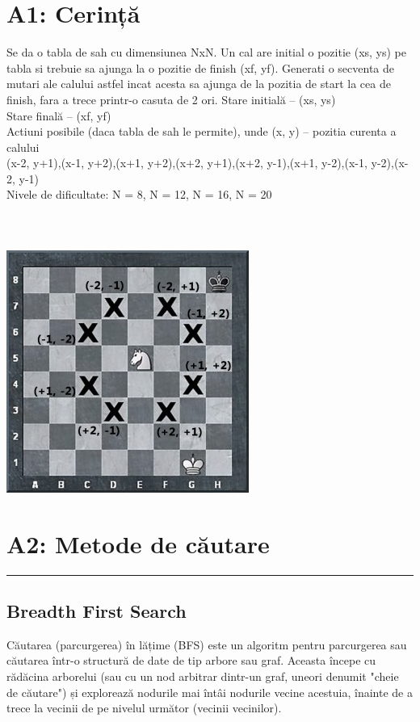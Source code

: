 \documentclass[a4paper,12pt]{report}
\begin{document}
\chapter{A1: Cerință} 
    Se da o tabla de sah cu dimensiunea NxN. Un cal are initial o pozitie (xs, ys) pe tabla si trebuie sa ajunga la o pozitie de finish (xf, yf). Generati o secventa de mutari ale calului astfel incat acesta sa ajunga de la pozitia de start la cea de finish, fara a trece printr-o casuta de 2 ori.
\linebreak 
\linebreak 
\linebreak 
Stare initială – (xs, ys) \\
Stare finală – (xf, yf) \\ 
Actiuni posibile (daca tabla de sah le permite), unde (x, y) – pozitia curenta a calului \\
(x-2, y+1),(x-1, y+2),(x+1, y+2),(x+2, y+1),(x+2, y-1),(x+1, y-2),(x-1, y-2),(x-2, y-1) \\
Nivele de dificultate: N = 8, N = 12, N = 16, N = 20
\\\\\\\\
\includegraphics{problema.png}
\chapter{A2: Metode de căutare} 
 
\rule{\textwidth}{0.5pt}
\section{Breadth First Search}
Căutarea (parcurgerea) în lățime (BFS) este un algoritm pentru parcurgerea sau căutarea într-o structură de date de tip arbore sau graf. Aceasta începe cu rădăcina arborelui (sau cu un nod arbitrar dintr-un graf, uneori denumit "cheie de căutare") și explorează nodurile mai întâi nodurile vecine acestuia, înainte de a trece la vecinii de pe nivelul următor (vecinii vecinilor).\\
\end{document}
